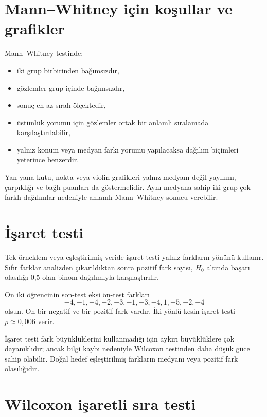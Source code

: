 \section{Mann--Whitney için koşullar ve grafikler}

Mann--Whitney testinde:

\begin{itemize}
  \item iki grup birbirinden bağımsızdır,
  \item gözlemler grup içinde bağımsızdır,
  \item sonuç en az sıralı ölçektedir,
  \item üstünlük yorumu için gözlemler ortak bir anlamlı sıralamada karşılaştırılabilir,
  \item yalnız konum veya medyan farkı yorumu yapılacaksa dağılım biçimleri yeterince benzerdir.
\end{itemize}

Yan yana kutu, nokta veya violin grafikleri yalnız medyanı değil yayılımı,
çarpıklığı ve bağlı puanları da göstermelidir. Aynı medyana sahip iki grup çok
farklı dağılımlar nedeniyle anlamlı Mann--Whitney sonucu verebilir.

\section{İşaret testi}

Tek örneklem veya eşleştirilmiş veride işaret testi yalnız farkların yönünü
kullanır. Sıfır farklar analizden çıkarıldıktan sonra pozitif fark sayısı,
$H_0$ altında başarı olasılığı 0,5 olan binom dağılımıyla karşılaştırılır.

On iki öğrencinin son-test eksi ön-test farkları
\[
-4,-1,-4,-2,-3,-1,-3,-4,1,-5,-2,-4
\]
olsun. On bir negatif ve bir pozitif fark vardır. İki yönlü kesin işaret testi
$p\approx0{,}006$ verir.

İşaret testi fark büyüklüklerini kullanmadığı için aykırı büyüklüklere çok
dayanıklıdır; ancak bilgi kaybı nedeniyle Wilcoxon testinden daha düşük güce
sahip olabilir. Doğal hedef eşleştirilmiş farkların medyanı veya pozitif fark
olasılığıdır.

\section{Wilcoxon işaretli sıra testi}

